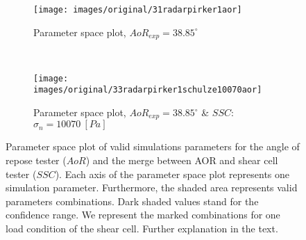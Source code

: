 \begin{figure}[htp] \centering
    \begin{subfigure}[b]{0.96\columnwidth}
        \texttt{[image: images/original/31radarpirker1aor]}
        \caption{Parameter space plot, $AoR_{exp} = 38.85 ^\circ$}
        \label{fig:31radarpirker1aor} 
    \end{subfigure}\\
        \begin{subfigure}[b]{0.96\columnwidth}
        \texttt{[image: images/original/33radarpirker1schulze10070aor]}
        \caption{Parameter space plot, $AoR_{exp} = 38.85
        ^\circ$ \& $SSC$: $\sigma_n=10070 ~[Pa]$}
        \label{fig:33radarpirker1schulze10070aor} 
    \end{subfigure}
    \caption[Parameter space plot of valid simulations parameters for the AOR and
    the merge between AOR and SCT valid parameters]{Parameter space plot of
    valid simulations parameters for the angle of repose tester ($AoR$) and the merge
    between AOR and shear cell tester ($SSC$).
    Each axis of the parameter space plot represents one simulation parameter.
    Furthermore, the shaded area represents valid parameters combinations.
    Dark shaded values stand for the confidence range.
    We represent the marked combinations for one load condition of the shear
    cell.
    Further explanation in the text. }
    \label{fig:35schulze10070aorradarandcloud}
\end{figure}